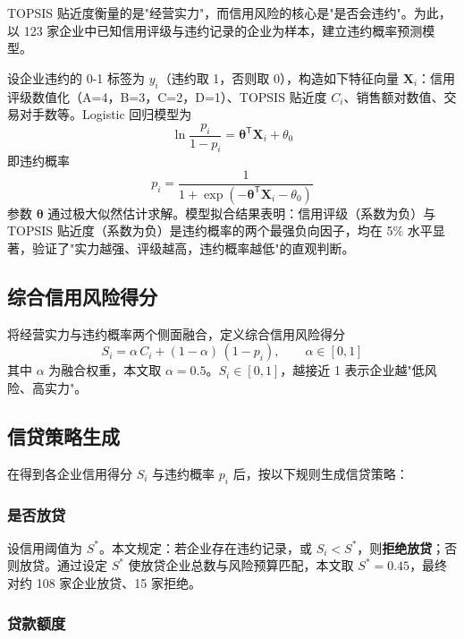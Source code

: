 \documentclass[12pt]{ctexart}
\begin{document}
TOPSIS 贴近度衡量的是"经营实力"，而信用风险的核心是"是否会违约"。为此，以 123 家企业中已知信用评级与违约记录的企业为样本，建立违约概率预测模型。

设企业违约的 0-1 标签为 $y_i$（违约取 1，否则取 0），构造如下特征向量 $\bm{X}_i$：信用评级数值化（A=4，B=3，C=2，D=1）、TOPSIS 贴近度 $C_i$、销售额对数值、交易对手数等。Logistic 回归模型为
\begin{equation}
\ln\frac{p_i}{1-p_i} = \bm{\theta}^{\mathsf{T}}\bm{X}_i + \theta_0
\end{equation}
即违约概率
\begin{equation}
p_i = \frac{1}{1+\exp(-\bm{\theta}^{\mathsf{T}}\bm{X}_i-\theta_0)}
\end{equation}
参数 $\bm{\theta}$ 通过极大似然估计求解。模型拟合结果表明：信用评级（系数为负）与 TOPSIS 贴近度（系数为负）是违约概率的两个最强负向因子，均在 5\% 水平显著，验证了"实力越强、评级越高，违约概率越低"的直观判断。

\subsection{综合信用风险得分}

将经营实力与违约概率两个侧面融合，定义综合信用风险得分
\begin{equation}
S_i = \alpha\, C_i + (1-\alpha)\,(1-p_i),\qquad \alpha\in[0,1]
\label{eq:score}
\end{equation}
其中 $\alpha$ 为融合权重，本文取 $\alpha=0.5$。$S_i\in[0,1]$，越接近 1 表示企业越"低风险、高实力"。

\subsection{信贷策略生成}

在得到各企业信用得分 $S_i$ 与违约概率 $p_i$ 后，按以下规则生成信贷策略：

\subsubsection{是否放贷}

设信用阈值为 $S^{*}$。本文规定：若企业存在违约记录，或 $S_i < S^{*}$，则\textbf{拒绝放贷}；否则放贷。通过设定 $S^{*}$ 使放贷企业总数与风险预算匹配，本文取 $S^{*}=0.45$，最终对约 108 家企业放贷、15 家拒绝。

\subsubsection{贷款额度}
\end{document}
